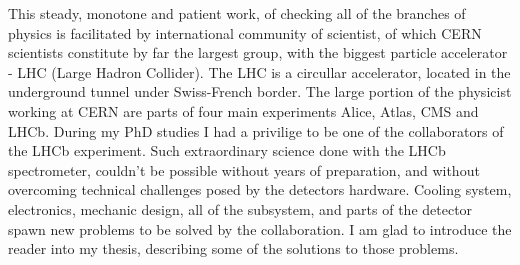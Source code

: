 This steady, monotone and patient work, of checking all of the branches of physics is facilitated by international community of scientist, of which CERN scientists constitute by far the largest group, with the biggest particle accelerator - LHC (Large Hadron Collider). The LHC is a circullar accelerator, located in the underground tunnel under Swiss-French border. The large portion of the physicist working at CERN are parts of four main experiments Alice, Atlas, CMS and LHCb. During my PhD studies I had a privilige to be one of the collaborators of the LHCb experiment. Such extraordinary science done with the LHCb spectrometer, couldn't be possible without years of preparation, and without overcoming technical challenges posed by the detectors hardware. Cooling system, electronics, mechanic design, all of the subsystem, and parts of the detector spawn new problems to be solved by the collaboration. I am glad to introduce the reader into my thesis, describing some of the solutions to those problems.  